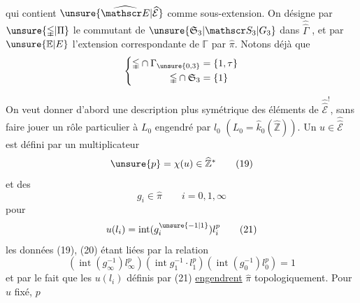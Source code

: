 qui contient $\unsure{\widehat{\mathscr E}|\widehat{\mathcal E}}$ comme sous-extension. On désigne par $\unsure{\mathbb\Gamma|\Pi}$ le commutant de $\unsure{\mathfrak S_3|\mathscr S_3|G_3}$ dans $\widehat{\widehat\Gamma}$ , et par $\unsure{\mathbb E|E}$ l'extension correspondante de $\mathbb\Gamma$ par $\widehat\pi$. Notons déjà que
\[
\left\{\begin{aligned}
\mathbb\Gamma\cap\Gamma_{\unsure{0,3}}&=\{1,\tau\}\\
\mathbb\Gamma\cap\mathfrak S_3&=\{1\}
\end{aligned}\right.
\]

On veut donner d'abord une description plus symétrique des éléments de $\widehat{\widehat{\mathscr E}}^{!}$, sans faire jouer un rôle particulier à $L_0$ engendré par $l_0$ $(L_0=\widehat k_0(\widehat{\mathbb Z}))$. Un $u\in\widehat{\widehat{\mathscr E}}$ est  défini par un multiplicateur
\[
\unsure{p}=\chi(u)\in\widehat{\mathbb Z}^{*}\tag*{(19)}
\]
et des
\[
g_i\in\widehat\pi\qquad i=0,1,\infty\tag*{(20)}
\]
pour
\[
u(l_i)=\operatorname{int}(g_i^{\unsure{-1|1}})l_i^p\tag*{(21)}
\]
les données (19), (20) étant liées par la relation
\[
(\operatorname{int}(g_\infty^{-1})l_\infty^p)(\operatorname{int}g_1^{-1}\cdot l_1^p)(\operatorname{int}(g_0^{-1})l_0^p)=1\tag*{(22)}
\]
et par le fait que les $u(l_i)$ définis par (21) \uline{engendrent} $\widehat\pi$ topologiquement. Pour $u$ fixé, $p$
